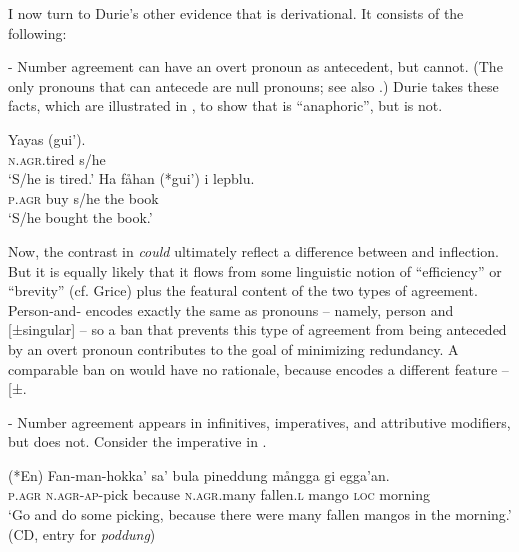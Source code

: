 \documentclass[output=paper,
modfonts
]{LSP/langsci}
\begin{document}
\begin{exe}
\begin{xlist}
I now turn to Durie's other evidence that  is
derivational. It consists of the following:

- Number agreement can have an overt pronoun as antecedent, but
 cannot. (The only pronouns that can antecede
 are null pronouns; see also \citealt[30--31]{chung1998}.) Durie takes these facts, which are illustrated in , to show
that  is ``anaphoric'', but 
is not.

\ea \label{ex:chung:17}
	\ea \label{ex:chung:17a} \gll  Yayas (gui').\\
		\textsc{n.agr.}tired s/he\\
		\glt `S/he is tired.'
	\ex \label{ex:chung:17b} \gll  Ha fåhan (*gui') i lepblu.\\
		\textsc{p.agr} buy s/he the book\\
		\glt `S/he bought the book.'
	\z
\z

Now, the contrast in  \emph{could} ultimately reflect a difference
between  and inflection. But it is equally likely that it
flows from some linguistic notion of ``efficiency'' or ``brevity'' (cf.
Grice) plus the featural content of the two types of agreement.
Person-and- encodes exactly the same  as
 pronouns -- namely, person  and {[}±singular{]} -- so a
ban that prevents this type of agreement from being anteceded by an
overt pronoun contributes to the goal of minimizing redundancy. A
comparable ban on  would have no rationale, because
 encodes a different feature -- {[}±\isi{plural}{]}.

- Number agreement appears in infinitives, imperatives, and attributive
modifiers, but  does not. Consider the
imperative in .

\ea \label{ex:chung:18}
\gll (*En) Fan-man-hokka' sa' bula pineddung mångga gi egga'an.\\
\textsc{p.agr} \textsc{n.agr-ap-}pick because \textsc{n.agr.}many fallen.\textsc{l} mango \textsc{loc} morning\\
\glt `Go and do some picking, because there were many fallen mangos in the
morning.' (CD, entry for \emph{poddung})
\z


\end{xlist}
\end{exe}
\end{document}
